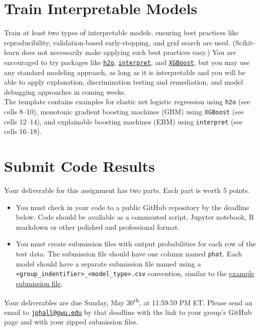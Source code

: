 \documentclass[fleqn]{article}
\begin{document}
\section{Train Interpretable Models}

Train at least two types of interpretable models, ensuring best practices like reproducibility, validation-based early-stopping, and grid search are used. (Scikit-learn does not necessarily make applying such best practices easy.) You are encouraged to try packages like \href{https://docs.h2o.ai/h2o/latest-stable/h2o-docs/downloading.html}{\texttt{h2o}}, \href{https://github.com/interpretml/interpret}{\texttt{interpret}}, and \href{https://xgboost.readthedocs.io/en/latest/install.html}{\texttt{XGBoost}}, but you may use any standard modeling approach, as long as it is interpretable and you will be able to apply explanation, discrimination testing and remediation, and model debugging approaches in coming weeks.\\

\noindent The template contains examples for elastic net logistic regression using \texttt{h2o} (see cells 8--10), monotonic gradient boosting machines (GBM) using \texttt{XGBoost} (see cells 12--14), and explainable boosting machines (EBM) using \texttt{interpret} (see cells 16--18). 

\section{Submit Code Results}

Your deliverable for this assignment has two parts. Each part is worth 5 points. 

\begin{itemize}
	\item You must check in your code to a public GitHub repository by the deadline below. Code should be available as a commented script, Jupyter notebook, R markdown or other polished and professional format. 
	\item You must create submission files with output probabilities for each row of the test data. The submission file should have one column named \texttt{phat}. Each model should have a separate submission file named using a \texttt{<group\_indentifier>\_<model\_type>.csv} convention, similar to the \href{}{example submission file}. 
\end{itemize}

\noindent Your deliverables are due Sunday, May 30\textsuperscript{th}, at 11:59:59 PM ET. Please send an email to \href{mailto:jphall@gwu.edu}{\texttt{jphall@gwu.edu}} by that deadline with the link to your group's GitHub page and with your zipped submission files. 
\end{document}
